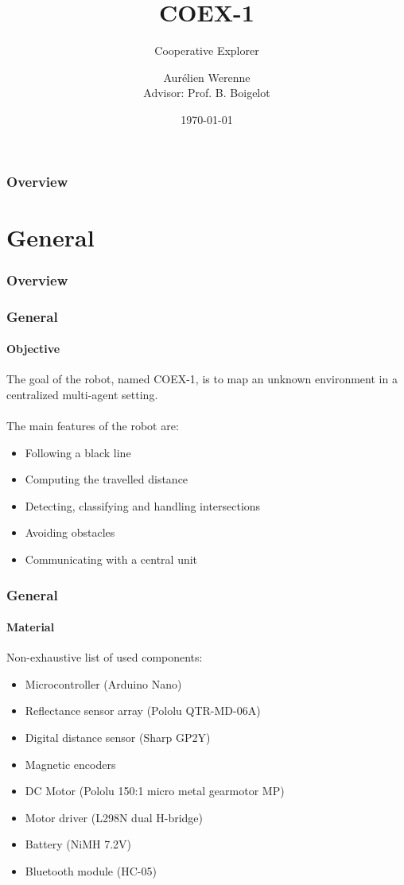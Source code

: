 \documentclass[10pt]{beamer}
\title[Cooperative Explorer]{COEX-1} %
\subtitle{Cooperative Explorer}
\author[Aurélien Werenne]{Aurélien Werenne \\ {\small Advisor: Prof. B. Boigelot}}
\institute[ULiège] 
{
University of Liège \\ 
\medskip
Link to code: \href{https://github.com/Werenne/multi-agent-mapping}{\textcolor{blue}{Github}}

}
\date{\today}
\begin{document}
\begin{frame}
\titlepage 
\end{frame}

\begin{frame}
\frametitle{Overview} 
\tableofcontents 
\end{frame}


\section{General} 

\begin{frame}
\frametitle{Overview}
\tableofcontents[currentsection,subsectionstyle=shaded]
\end{frame}

\begin{frame}
\frametitle{General}
\framesubtitle{Objective}
The goal of the robot, named COEX-1, is to map an unknown environment in a centralized multi-agent setting.\\~\\
The main features of the robot are:
\begin{itemize}
\item Following a black line
\item Computing the travelled distance
\item Detecting, classifying and handling intersections
\item Avoiding obstacles
\item Communicating with a central unit 
\end{itemize}
\end{frame}

\begin{frame}
\frametitle{General}
\framesubtitle{Material}
Non-exhaustive list of used components:
\begin{itemize}
\item Microcontroller (Arduino Nano) 
\item Reflectance sensor array (Pololu QTR-MD-06A)
\item Digital distance sensor (Sharp GP2Y)
\item Magnetic encoders 
\item DC Motor (Pololu 150:1 micro metal gearmotor MP)
\item Motor driver (L298N dual H-bridge) 
\item Battery (NiMH 7.2V) 
\item Bluetooth module (HC-05) 
\end{itemize}
\end{frame}
\end{document}
